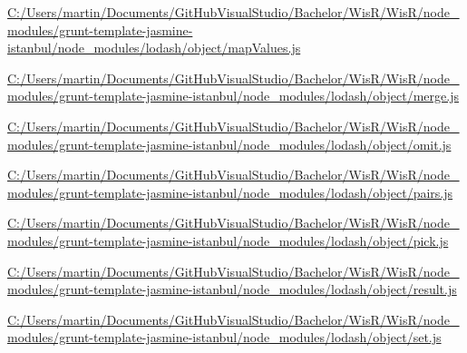 \begin{DoxyCompactItemize}
\item 
\hyperlink{_c_1_2_users_2martin_2_documents_2_git_hub_visual_studio_2_bachelor_2_wis_r_2_wis_r_2node_module39e3e83072f255408612af36373d234f}{C\+:/\+Users/martin/\+Documents/\+Git\+Hub\+Visual\+Studio/\+Bachelor/\+Wis\+R/\+Wis\+R/node\+\_\+modules/grunt-\/template-\/jasmine-\/istanbul/node\+\_\+modules/lodash/object/map\+Values.\+js}
\item 
\hyperlink{_c_1_2_users_2martin_2_documents_2_git_hub_visual_studio_2_bachelor_2_wis_r_2_wis_r_2node_modulecb4db7444c470be3223ba35735193956}{C\+:/\+Users/martin/\+Documents/\+Git\+Hub\+Visual\+Studio/\+Bachelor/\+Wis\+R/\+Wis\+R/node\+\_\+modules/grunt-\/template-\/jasmine-\/istanbul/node\+\_\+modules/lodash/object/merge.\+js}
\item 
\hyperlink{_c_1_2_users_2martin_2_documents_2_git_hub_visual_studio_2_bachelor_2_wis_r_2_wis_r_2node_module06f9103e837749748bfc9871670d3715}{C\+:/\+Users/martin/\+Documents/\+Git\+Hub\+Visual\+Studio/\+Bachelor/\+Wis\+R/\+Wis\+R/node\+\_\+modules/grunt-\/template-\/jasmine-\/istanbul/node\+\_\+modules/lodash/object/omit.\+js}
\item 
\hyperlink{_c_1_2_users_2martin_2_documents_2_git_hub_visual_studio_2_bachelor_2_wis_r_2_wis_r_2node_moduleebabdeae616818e8459f6da002772d8b}{C\+:/\+Users/martin/\+Documents/\+Git\+Hub\+Visual\+Studio/\+Bachelor/\+Wis\+R/\+Wis\+R/node\+\_\+modules/grunt-\/template-\/jasmine-\/istanbul/node\+\_\+modules/lodash/object/pairs.\+js}
\item 
\hyperlink{_c_1_2_users_2martin_2_documents_2_git_hub_visual_studio_2_bachelor_2_wis_r_2_wis_r_2node_module8be978983206cdb84953ba0620a20919}{C\+:/\+Users/martin/\+Documents/\+Git\+Hub\+Visual\+Studio/\+Bachelor/\+Wis\+R/\+Wis\+R/node\+\_\+modules/grunt-\/template-\/jasmine-\/istanbul/node\+\_\+modules/lodash/object/pick.\+js}
\item 
\hyperlink{_c_1_2_users_2martin_2_documents_2_git_hub_visual_studio_2_bachelor_2_wis_r_2_wis_r_2node_module9b36999384d934418c265def52fa8f7b}{C\+:/\+Users/martin/\+Documents/\+Git\+Hub\+Visual\+Studio/\+Bachelor/\+Wis\+R/\+Wis\+R/node\+\_\+modules/grunt-\/template-\/jasmine-\/istanbul/node\+\_\+modules/lodash/object/result.\+js}
\item 
\hyperlink{_c_1_2_users_2martin_2_documents_2_git_hub_visual_studio_2_bachelor_2_wis_r_2_wis_r_2node_module21569a525cd2685e4964a4da5e697c17}{C\+:/\+Users/martin/\+Documents/\+Git\+Hub\+Visual\+Studio/\+Bachelor/\+Wis\+R/\+Wis\+R/node\+\_\+modules/grunt-\/template-\/jasmine-\/istanbul/node\+\_\+modules/lodash/object/set.\+js}

\end{DoxyCompactItemize}
